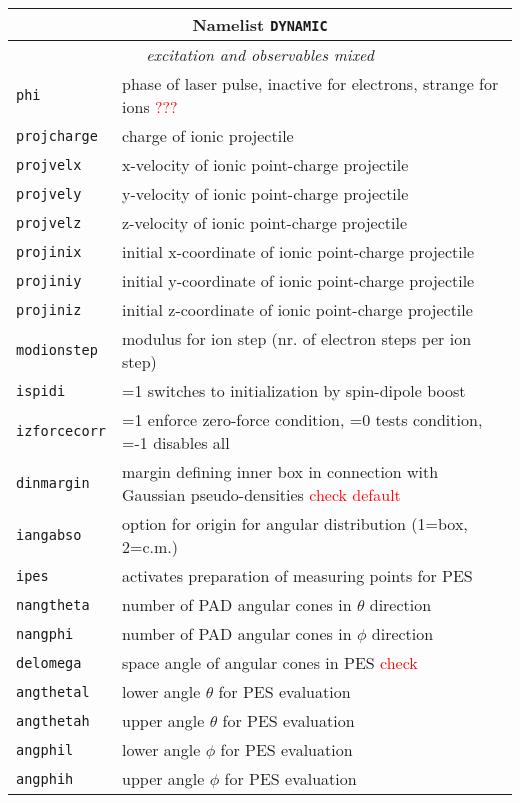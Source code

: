\documentclass[12pt]{article}
\begin{document}
\begin{tabular}{ll}
\hline
\multicolumn{2}{c}{Namelist {\tt DYNAMIC}} in {\tt for005.<name>} \\
\hline
\multicolumn{2}{c}{\it excitation and observables mixed} \\
\hline
{\tt phi} & phase of laser pulse, inactive for electrons, strange
for ions \textcolor{red}{???} \\
{\tt projcharge} &  charge of ionic projectile \\
{\tt projvelx} &  x-velocity of ionic point-charge  projectile\\
{\tt projvely} &  y-velocity of ionic point-charge  projectile  \\
{\tt projvelz} &  z-velocity of ionic point-charge  projectile  \\
{\tt projinix} &  initial x-coordinate of ionic point-charge projectile  \\
{\tt projiniy} &  initial y-coordinate of ionic point-charge  projectile  \\
{\tt projiniz} &  initial z-coordinate of ionic point-charge  projectile  \\
{\tt modionstep} & modulus for ion step (nr. of electron steps per ion
step)\\
{\tt ispidi} & =1  switches to initialization by spin-dipole boost\\
{\tt izforcecorr} & =1 enforce zero-force condition, =0 tests
condition, =-1 disables all  \\
{\tt dinmargin} & margin defining inner box in connection with
Gaussian pseudo-densities \textcolor{red}{check default}\\
{\tt iangabso} & option for origin for angular distribution (1=box,
2=c.m.) \\
{\tt ipes} & activates preparation of measuring points for PES \\
{\tt nangtheta} & number of PAD angular cones in $\theta$ direction \\
{\tt nangphi} &  number of PAD angular cones in $\phi$ direction \\
{\tt delomega} &  space angle of angular cones in PES \textcolor{red}{check}\\
{\tt angthetal} & lower angle  $\theta$ for PES evaluation \\
{\tt angthetah} & upper angle  $\theta$ for PES evaluation  \\
{\tt angphil} &  lower angle  $\phi$ for PES evaluation \\
{\tt angphih} &  upper angle  $\phi$ for PES evaluation \\

\end{tabular}
\end{document}
